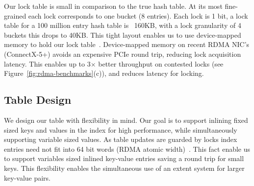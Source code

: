 

Our lock table is small in comparison to the true hash
table. At its most fine-grained each lock corresponds to
one bucket (8 entries). Each lock is 1 bit, a lock table for
a 100 million entry hash table is ~160KB, with a lock
granularity of 4 buckets this drops to 40KB. This tight
layout enables us to use device-mapped memory to hold our
lock table~\cite{design-guidelines,sherman}.
Device-mapped memory on recent RDMA NIC's (ConnectX-5+) avoids an
expensive PCIe round trip, reducing lock acquisition latency.
This enables up
to 3$\times$ better throughput on contested locks (see
Figure~\ref{fig:rdma-benchmarks}(c)), and reduces latency
for locking.

\subsection{Table Design}

We design our table with flexibility in mind. Our goal is to
support inlining fixed sized keys and values in the index
for high performance, while simultaneously supporting
variable sized values. As table updates are guarded by locks
index entries need not fit into 64 bit words (RDMA atomic
width)~\cite{race,fusee}. This fact enable us to support
variables sized inlined key-value entries saving a round
trip for small keys. This flexibility enables the
simultaneous use of an extent system for larger key-value
pairs. 

